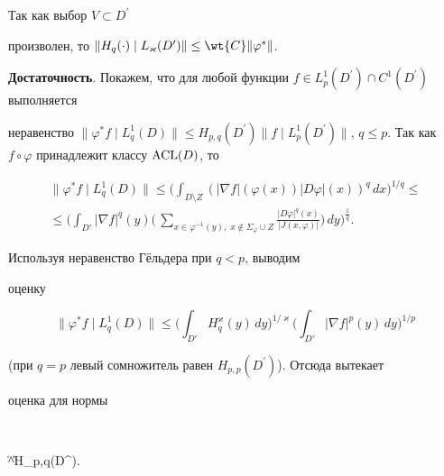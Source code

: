 Так как выбор $V\subset D^{\prime}$


произволен, то $\|H_q(\cdot)\mid L_{\varkappa}(D^\prime)\|\leq


\wt{C}\|\varphi^{\ast}\|$.


\medskip





{\bf Достаточность}. Покажем, что для любой функции $f\in


L_p^1(D^{\prime})\cap C^1(D^{\prime})$ выполняется


неравенство $\|\varphi^*f\mid L_q^1(D)\|\le


H_{p,q}(D^{\prime})\|f\mid L_p^1(D^{\prime})\|$, $q\leq


p$. Так как $f\circ\varphi$ принадлежит классу $\ACL(D)$, то


\begin{multline*}


\|\varphi^* f\mid L_q^1(D)\|\le


\bigg(\int_{D\setminus Z}(|\nabla


f|(\varphi(x))|D\varphi|(x))^q\,dx\bigg)^{1/q}\le \\ \leq


\bigg(\int_{D'}|\nabla f|^q(y)


\bigg(\,\sum_{x\in\varphi^{-1}(y),\;x\notin


\Sigma_{\varphi}\cup Z}


\frac{|D\varphi|^q(x)}{|J(x,\varphi)|}\bigg) \,dy\bigg)^{\frac{1}{q}}.


\end{multline*}


Используя неравенство Г\"ельдера при $q<p$, выводим


оценку


\begin{equation}


\|\varphi^*f\mid L_q^1(D)\|\le


\bigg(\int_{D'}H^{\varkappa}_q(y)\,dy\bigg)^{1/\varkappa}


\bigg(\int_{D'}|\nabla f|^p(y) \,dy\bigg)^{1/p}


\end{equation}


(при $q=p$ левый сомножитель равен $H_{p,p}(D^{\prime})$). Отсюда вытекает


оценка для нормы


$$


\|\varphi^{\ast}\|\leq H_{p,q}(D^{\prime}).



